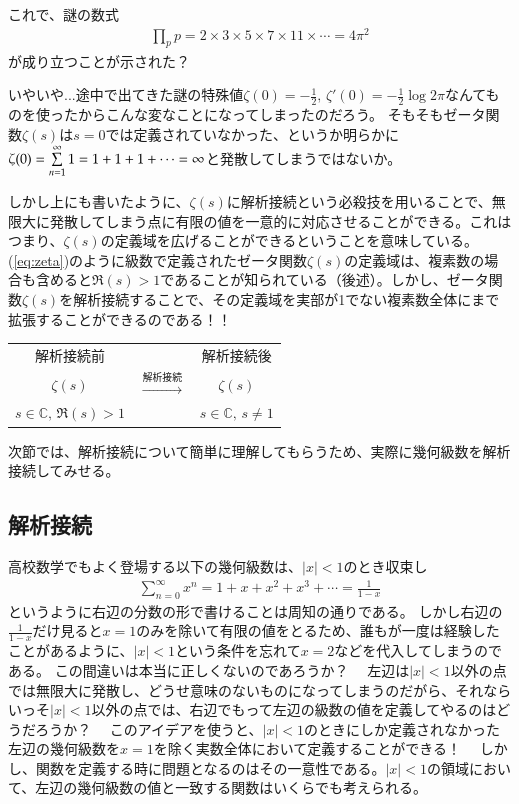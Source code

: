 \documentclass[11pt,b5paper,papersize,dvipdfmx]{jsbook}
\begin{document}
これで、謎の数式
\begin{align}
  \prod_p p = 2\times 3\times 5\times 7\times 11\times\cdots = 4\pi^2
\end{align}
が成り立つことが示された？ \par
いやいや...途中で出てきた謎の特殊値$\zeta(0) = -\frac12,\, \zeta'(0) = -\frac12\log 2\pi$なんてものを使ったからこんな変なことになってしまったのだろう。
そもそもゼータ関数$\zeta(s)$は$s=0$では定義されていなかった、というか明らかに$\zeta(0) = \sum\limits_{n=1}^\infty 1 = 1+1+1+\cdots = \infty$と発散してしまうではないか。\par
しかし上にも書いたように、$\zeta(s)$に解析接続という必殺技を用いることで、無限大に発散してしまう点に有限の値を一意的に対応させることができる。これはつまり、$\zeta(s)$の定義域を広げることができるということを意味している。
(\ref{eq:zeta})のように級数で定義されたゼータ関数$\zeta(s)$の定義域は、複素数の場合も含めると$\Re(s)>1$であることが知られている（後述）。しかし、ゼータ関数$\zeta(s)$を解析接続することで、その定義域を実部が1でない複素数全体にまで拡張することができるのである！！\par
\begin{center}
  \begin{tabular}{ccc}
    解析接続前 &  & 解析接続後\\
    $\zeta(s)$ & $\xrightarrow{解析接続}$ & $\zeta(s)$\\
    $s\in\mathbb{C},\, \Re(s)>1$ &  & $s\in\mathbb{C},\, s\ne 1$
  \end{tabular}
\end{center}\par
次節では、解析接続について簡単に理解してもらうため、実際に幾何級数を解析接続してみせる。


%
\subsection{解析接続}
高校数学でもよく登場する以下の幾何級数は、$|x|<1$のとき収束し
\begin{align*}
  \sum_{n=0}^\infty x^n = 1 + x + x^2 + x^3 + \cdots
  = \frac1{1-x}
\end{align*}
というように右辺の分数の形で書けることは周知の通りである。
しかし右辺の$\frac1{1-x}$だけ見ると$x=1$のみを除いて有限の値をとるため、誰もが一度は経験したことがあるように、$|x|<1$という条件を忘れて$x=2$などを代入してしまうのである。
この間違いは本当に正しくないのであろうか？　
左辺は$|x|<1$以外の点では無限大に発散し、どうせ意味のないものになってしまうのだがら、それならいっそ$|x|<1$以外の点では、右辺でもって左辺の級数の値を定義してやるのはどうだろうか？　
このアイデアを使うと、$|x|<1$のときにしか定義されなかった左辺の幾何級数を$x=1$を除く実数全体において定義することができる！　
しかし、関数を定義する時に問題となるのはその一意性である。$|x|<1$の領域において、左辺の幾何級数の値と一致する関数はいくらでも考えられる。\par
\end{document}
